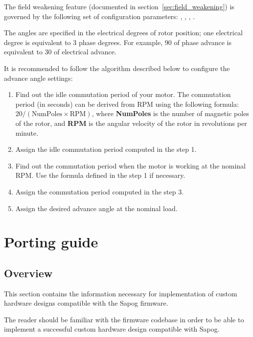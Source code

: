 \documentclass{zubaxdoc}
\begin{document}
The field weakening feature (documented in section~\ref{sec:field_weakening}) is governed by the following
set of configuration parameters:
, , , .

The angles are specified in the electrical degrees of rotor position;
one electrical degree is equivalent to 3 phase degrees.
For example, 90\textdegree{} of phase advance is equivalent to 30\textdegree{} of electrical advance.

It is recommended to follow the algorithm described below to configure the advance angle settings:

\begin{enumerate}
	\item Find out the idle commutation period of your motor.
	The commutation period (in seconds) can be derived from RPM using the following formula:
	$20 / (\text{NumPoles}\times\text{RPM})$, where \textbf{NumPoles} is the number of magnetic poles
	of the rotor, and \textbf{RPM} is the angular velocity of the rotor in revolutions per minute.
	
	\item Assign  the idle commutation period computed in the step 1.
	
	\item Find out the commutation period when the motor is working at the nominal RPM.
	Use the formula defined in the step 1 if necessary.
	
	\item Assign  the commutation period computed in the step 3.
	
	\item Assign  the desired advance angle at the nominal load.
\end{enumerate}

\chapter{Porting guide}\label{sec:porting_guide}

\section{Overview}

This section contains the information necessary for implementation of custom hardware designs compatible with the
Sapog firmware.

The reader should be familiar with the firmware codebase in order to be able to implement a successful
custom hardware design compatible with Sapog.
\end{document}
